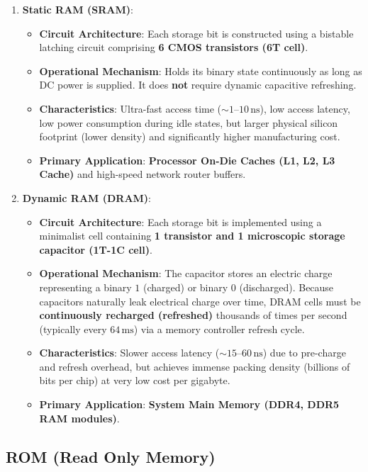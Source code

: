 \begin{enumerate}[leftmargin=1.5em]
    \item \textbf{Static RAM (SRAM)}:
    \begin{itemize}
        \item \textbf{Circuit Architecture}: Each storage bit is constructed using a bistable latching circuit comprising \textbf{6 CMOS transistors (6T cell)}.
        \item \textbf{Operational Mechanism}: Holds its binary state continuously as long as DC power is supplied. It does \textbf{not} require dynamic capacitive refreshing.
        \item \textbf{Characteristics}: Ultra-fast access time ($\sim 1\text{--}10\,\text{ns}$), low access latency, low power consumption during idle states, but larger physical silicon footprint (lower density) and significantly higher manufacturing cost.
        \item \textbf{Primary Application}: \textbf{Processor On-Die Caches (L1, L2, L3 Cache)} and high-speed network router buffers.
    \end{itemize}
    \item \textbf{Dynamic RAM (DRAM)}:
    \begin{itemize}
        \item \textbf{Circuit Architecture}: Each storage bit is implemented using a minimalist cell containing \textbf{1 transistor and 1 microscopic storage capacitor (1T-1C cell)}.
        \item \textbf{Operational Mechanism}: The capacitor stores an electric charge representing a binary $1$ (charged) or binary $0$ (discharged). Because capacitors naturally leak electrical charge over time, DRAM cells must be \textbf{continuously recharged (refreshed)} thousands of times per second (typically every $64\,\text{ms}$) via a memory controller refresh cycle.
        \item \textbf{Characteristics}: Slower access latency ($\sim 15\text{--}60\,\text{ns}$) due to pre-charge and refresh overhead, but achieves immense packing density (billions of bits per chip) at very low cost per gigabyte.
        \item \textbf{Primary Application}: \textbf{System Main Memory (DDR4, DDR5 RAM modules)}.
    \end{itemize}
\end{enumerate}

\subsection{ROM (Read Only Memory)}

